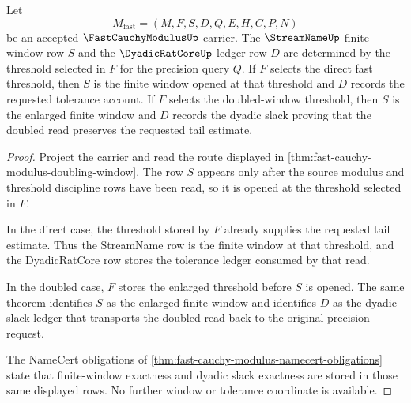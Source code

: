 \begin{theorem}
\label{thm:fast-cauchy-modulus-window-exactness}
Let
$$
M_{\mathrm{fast}}=(M,F,S,D,Q,E,H,C,P,N)
$$
be an accepted $\FastCauchyModulusUp$ carrier. The $\StreamNameUp$ finite window row $S$ and the $\DyadicRatCoreUp$ ledger row $D$ are determined by the threshold selected in $F$ for the precision query $Q$. If $F$ selects the direct fast threshold, then $S$ is the finite window opened at that threshold and $D$ records the requested tolerance account. If $F$ selects the doubled-window threshold, then $S$ is the enlarged finite window and $D$ records the dyadic slack proving that the doubled read preserves the requested tail estimate.
\end{theorem}
\begin{proof}
Project the carrier and read the route displayed in \autoref{thm:fast-cauchy-modulus-doubling-window}. The row $S$ appears only after the source modulus and threshold discipline rows have been read, so it is opened at the threshold selected in $F$.

In the direct case, the threshold stored by $F$ already supplies the requested tail estimate. Thus the StreamName row is the finite window at that threshold, and the DyadicRatCore row stores the tolerance ledger consumed by that read.

In the doubled case, $F$ stores the enlarged threshold before $S$ is opened. The same theorem identifies $S$ as the enlarged finite window and identifies $D$ as the dyadic slack ledger that transports the doubled read back to the original precision request.

The NameCert obligations of \autoref{thm:fast-cauchy-modulus-namecert-obligations} state that finite-window exactness and dyadic slack exactness are stored in those same displayed rows. No further window or tolerance coordinate is available.
\end{proof}

